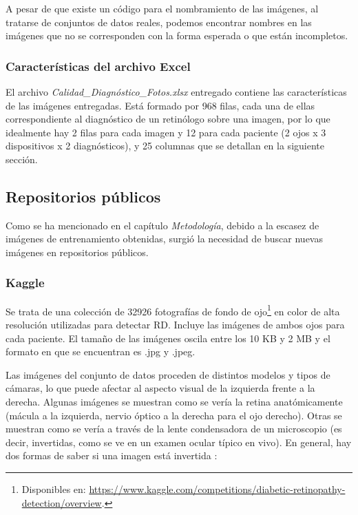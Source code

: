 A pesar de que existe un código para el nombramiento de las imágenes, al tratarse de conjuntos de datos reales, podemos encontrar nombres en las imágenes que no se corresponden con la forma esperada o que están incompletos.

\subsubsection{Características del archivo Excel}

El archivo \textit{Calidad\_Diagnóstico\_Fotos.xlsx} entregado contiene las características de las imágenes entregadas. Está formado por 968 filas, cada una de ellas correspondiente al diagnóstico de un retinólogo sobre una imagen, por lo que idealmente hay 2 filas para cada imagen y 12 para cada paciente (2 ojos x 3 dispositivos x 2 diagnósticos), y 25 columnas que se detallan en la siguiente sección.

\subsection{Repositorios públicos}

Como se ha mencionado en el capítulo \textit{Metodología}, debido a la escasez de imágenes de entrenamiento obtenidas, surgió la necesidad de buscar nuevas imágenes en repositorios públicos.

\subsubsection{Kaggle}

Se trata de una colección de 32926 fotografías de fondo de ojo\footnote{Disponibles en: \url{https://www.kaggle.com/competitions/diabetic-retinopathy-detection/overview}.} en color de alta resolución utilizadas para detectar RD. Incluye las imágenes de ambos ojos para cada paciente. El tamaño de las imágenes oscila entre los 10 KB y 2 MB y el formato en que se encuentran es .jpg y .jpeg.

Las imágenes del conjunto de datos proceden de distintos modelos y tipos de cámaras, lo que puede afectar al aspecto visual de la izquierda frente a la derecha. Algunas imágenes se muestran como se vería la retina anatómicamente (mácula a la izquierda, nervio óptico a la derecha para el ojo derecho). Otras se muestran como se vería a través de la lente condensadora de un microscopio (es decir, invertidas, como se ve en un examen ocular típico en vivo). En general, hay dos formas de saber si una imagen está invertida \cite{datos:kaggle}:

